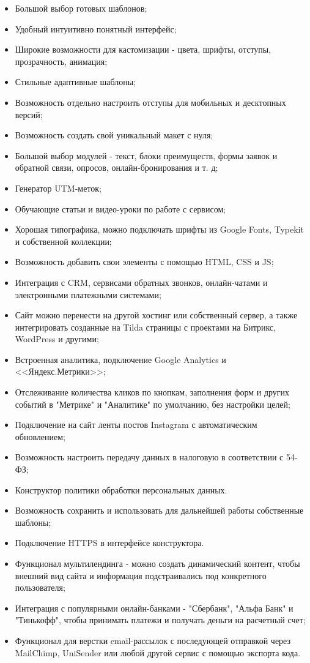\begin{itemize}
	\item	Большой выбор готовых шаблонов;
	\item	Удобный интуитивно понятный интерфейс;
	\item	Широкие возможности для кастомизации - цвета, шрифты, отступы, прозрачность, анимация;
	\item	Стильные адаптивные шаблоны;
	\item	Возможность отдельно настроить отступы для мобильных и десктопных версий;
	\item	Возможность создать свой уникальный макет с нуля;
	\item	Большой выбор модулей - текст, блоки преимуществ, формы заявок и обратной связи, опросов, онлайн-бронирования и т. д;
	\item	Генератор UTM-меток;
	\item	Обучающие статьи и видео-уроки по работе с сервисом;
	\item	Хорошая типографика, можно подключать шрифты из Google Fonts, Typekit и собственной коллекции;
	\item	Возможность добавить свои элементы с помощью HTML, CSS и JS;
	\item	Интеграция с CRM, сервисами обратных звонков, онлайн-чатами и электронными платежными системами;
	\item	Сайт можно перенести на другой хостинг или собственный сервер, а также интегрировать созданные на Tilda страницы с проектами на Битрикс, WordPress и другими;
	\item	Встроенная аналитика, подключение Google Analytics и <<Яндекс.Метрики>>;
	\item	Отслеживание количества кликов по кнопкам, заполнения форм и других событий в "Метрике" и "Аналитике" по умолчанию, без настройки целей;
	\item	Подключение на сайт ленты постов Instagram с автоматическим обновлением;
	\item	Возможность настроить передачу данных в налоговую в соответствии с 54-ФЗ;
	\item	Конструктор политики обработки персональных данных.
	\item	Возможность сохранить и использовать для дальнейшей работы собственные шаблоны;
	\item	Подключение HTTPS в интерфейсе конструктора.
	\item	Функционал мультилендинга - можно создать динамический контент, чтобы внешний вид сайта и информация подстраивались под конкретного пользователя;
	\item	Интеграция с популярными онлайн-банками - "Сбербанк", "Альфа Банк" и "Тинькофф", чтобы принимать платежи и получать деньги на расчетный счет;
	\item	Функционал для верстки email-рассылок с последующей отправкой через MailChimp, UniSender или любой другой сервис с помощью экспорта кода.
\end{itemize}

